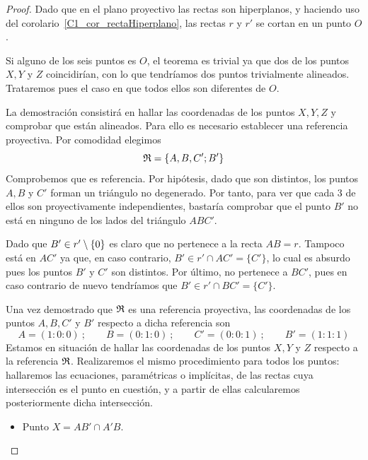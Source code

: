 \begin{proof}
	Dado que en el plano proyectivo las rectas son hiperplanos, y haciendo uso del corolario~\ref{C1_cor_rectaHiperplano}, las rectas $r$ y $r'$ se cortan en un punto $O$. 
	
	Si alguno de los seis puntos es $O$, el teorema es trivial ya que dos de los puntos $X,Y$ y $Z$ coincidirían, con lo que tendríamos dos puntos trivialmente alineados. Trataremos pues el caso en que todos ellos son diferentes de $O$.
	
	La demostración consistirá en hallar las coordenadas de los puntos $X,Y,Z$ y comprobar que están alineados. Para ello es necesario establecer una referencia proyectiva. Por comodidad elegimos
	\begin{equation*}
		\mathfrak{R}=\{A,B,C';B'\}
	\end{equation*}
	Comprobemos que es referencia. Por hipótesis, dado que son distintos, los puntos $A,B$ y $C'$ forman un triángulo no degenerado. Por tanto, para ver que cada $3$ de ellos son proyectivamente independientes, bastaría comprobar que el punto $B'$ no está en ninguno de los lados del triángulo $ABC'$.
	
	Dado que $B'\in r'\setminus\{0\}$ es claro que no pertenece a la recta $AB=r$. Tampoco está en $AC'$ ya que, en caso contrario, $B'\in r'\cap AC'=\{C'\}$, lo cual es absurdo pues los puntos $B'$ y $C'$ son distintos. Por último, no pertenece a $BC'$, pues en caso contrario de nuevo tendríamos que $B'\in r'\cap BC'=\{C'\}$. 
	
	Una vez demostrado que $\mathfrak{R}$ es una referencia proyectiva, las coordenadas de los puntos $A,B,C'$ y $B'$ respecto a dicha referencia son
	\begin{equation*}
		A=(1:0:0) \ ; \qquad B=(0:1:0) \ ; \qquad C'=(0:0:1) \ ; \qquad B'=(1:1:1)
	\end{equation*}
	Estamos en situación de hallar las coordenadas de los puntos $X,Y$ y $Z$ respecto a la referencia $\mathfrak{R}$. Realizaremos el mismo procedimiento para todos los puntos: hallaremos las ecuaciones, paramétricas o implícitas, de las rectas cuya intersección es el punto en cuestión, y a partir de ellas calcularemos posteriormente dicha intersección.
	\begin{itemize}
		\item Punto $X=AB'\cap A'B$.
		

\end{itemize}
\end{proof}

